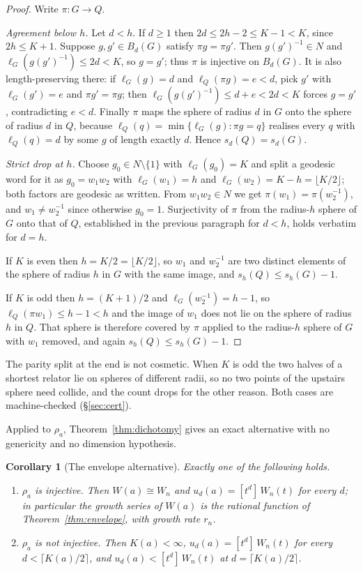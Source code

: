 \documentclass[11pt,a4paper]{article}
\newtheorem{corollary}[theorem]{Corollary}
\theoremstyle{definition}
\theoremstyle{remark}
\theoremstyle{plain}
\begin{document}
\begin{proof}
Write $\pi:G\to Q$.

\emph{Agreement below $h$.} Let $d<h$. If $d\ge1$ then $2d\le2h-2\le K-1<K$, since $2h\le K+1$.
Suppose $g,g'\in B_d(G)$ satisfy $\pi g=\pi g'$. Then $g(g')^{-1}\in N$ and
$\ell_G(g(g')^{-1})\le2d<K$, so $g=g'$; thus $\pi$ is injective on $B_d(G)$. It is also
length-preserving there: if $\ell_G(g)=d$ and $\ell_Q(\pi g)=e<d$, pick $g'$ with
$\ell_G(g')=e$ and $\pi g'=\pi g$; then $\ell_G(g(g')^{-1})\le d+e<2d<K$ forces $g=g'$,
contradicting $e<d$. Finally $\pi$ maps the sphere of radius $d$ in $G$ onto the sphere of
radius $d$ in $Q$, because $\ell_Q(q)=\min\{\ell_G(g):\pi g=q\}$ realises every $q$ with
$\ell_Q(q)=d$ by some $g$ of length exactly $d$. Hence $s_d(Q)=s_d(G)$.

\emph{Strict drop at $h$.} Choose $g_0\in N\setminus\{1\}$ with $\ell_G(g_0)=K$ and split a
geodesic word for it as $g_0=w_1w_2$ with $\ell_G(w_1)=h$ and
$\ell_G(w_2)=K-h=\lfloor K/2\rfloor$; both factors are geodesic as written. From $w_1w_2\in N$
we get $\pi(w_1)=\pi(w_2^{-1})$, and $w_1\ne w_2^{-1}$ since otherwise $g_0=1$. Surjectivity of
$\pi$ from the radius-$h$ sphere of $G$ onto that of $Q$, established in the previous paragraph
for $d<h$, holds verbatim for $d=h$.

If $K$ is even then $h=K/2=\lfloor K/2\rfloor$, so $w_1$ and $w_2^{-1}$ are two distinct
elements of the sphere of radius $h$ in $G$ with the same image, and $s_h(Q)\le s_h(G)-1$.

If $K$ is odd then $h=(K+1)/2$ and $\ell_G(w_2^{-1})=h-1$, so $\ell_Q(\pi w_1)\le h-1<h$ and the
image of $w_1$ does not lie on the sphere of radius $h$ in $Q$. That sphere is therefore covered
by $\pi$ applied to the radius-$h$ sphere of $G$ with $w_1$ removed, and again
$s_h(Q)\le s_h(G)-1$.
\end{proof}

The parity split at the end is not cosmetic. When $K$ is odd the two halves of a shortest
relator lie on spheres of different radii, so no two points of the upstairs sphere need collide,
and the count drops for the other reason. Both cases are machine-checked
(\S\ref{sec:cert}).

Applied to $\rho_a$, Theorem~\ref{thm:dichotomy} gives an exact alternative with no genericity
and no dimension hypothesis.

\begin{corollary}[The envelope alternative]\label{cor:alternative}
Exactly one of the following holds.
\begin{enumerate}[label=(\roman*),leftmargin=2.2em]
\item $\rho_a$ is injective. Then $W(a)\cong W_n$ and $u_d(a)=[t^d]\,W_n(t)$ for every $d$; in
particular the growth series of $W(a)$ is the rational function of
Theorem~\ref{thm:envelope}, with growth rate $r_n$.
\item $\rho_a$ is not injective. Then $K(a)<\infty$, $u_d(a)=[t^d]\,W_n(t)$ for every
$d<\lceil K(a)/2\rceil$, and $u_d(a)<[t^d]\,W_n(t)$ at $d=\lceil K(a)/2\rceil$.
\end{enumerate}
\end{corollary}
\end{document}

